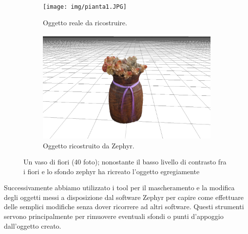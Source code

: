 \documentclass[12pt]{report}
\begin{document}
\begin{figure}[H]
  \centering
  \begin{subfigure}[b]{0.365\linewidth}
    \centering
    \texttt{[image: img/pianta1.JPG]}
    \caption{Oggetto reale da ricostruire.}
  \end{subfigure}
  \begin{subfigure}[b]{0.4\linewidth}
    \centering
    \includegraphics[width=\linewidth]{img/pianta.png}
    \caption{Oggetto ricostruito da Zephyr.}
  \end{subfigure}
  \captionsetup{justification=centering}
  \caption{Un vaso di fiori (40 foto); nonostante il basso livello di contrasto fra i fiori e lo sfondo zephyr ha ricreato l'oggetto egregiamente}
\end{figure}
Successivamente abbiamo utilizzato i tool per il mascheramento e la modifica degli oggetti messi a disposizione dal software Zephyr per capire come effettuare delle semplici modifiche senza dover ricorrere ad altri software.
Questi strumenti servono principalmente per rimuovere eventuali sfondi o punti d'appoggio dall'oggetto creato.
\end{document}

